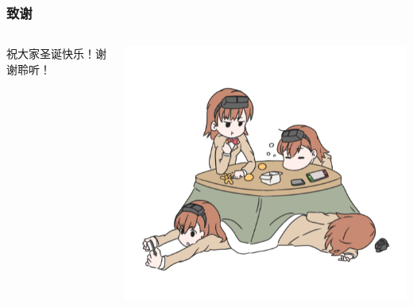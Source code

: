 \documentclass[12pt,AutoFakeBold,aspectratio=43,mathserif]{beamer}
\begin{document}
    \begin{frame}
        \frametitle{致谢}
        \begin{columns}
            \begin{column}{.5\linewidth}
                祝大家圣诞快乐！谢谢聆听！
            \end{column}
            \begin{column}{.5\linewidth}
                \includegraphics[width=.4\paperwidth]{figures/misaka558.png}
            \end{column}
        \end{columns}
    \end{frame}
    
\end{document}
